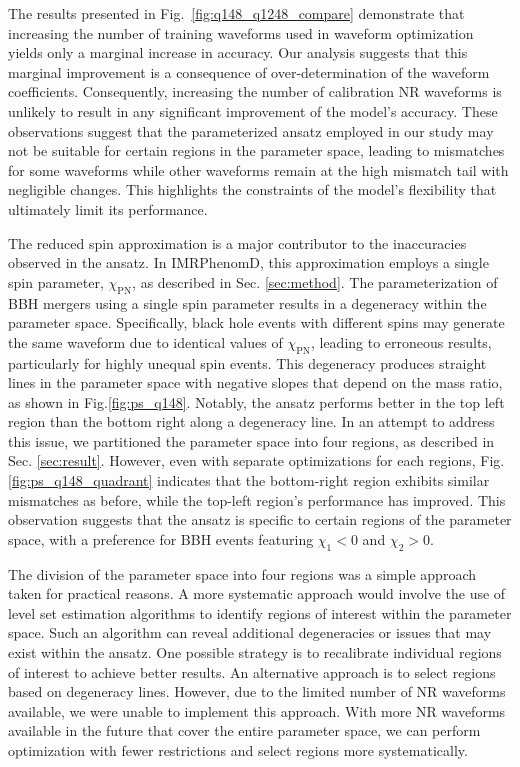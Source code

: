 \documentclass[twocolumn]{aastex631}
\begin{document}
The results presented in Fig.~\ref{fig:q148_q1248_compare} demonstrate that
increasing the number of training waveforms used in waveform optimization yields
only a marginal increase in accuracy. Our analysis suggests that this marginal
improvement is a consequence of over-determination of the waveform coefficients.
Consequently, increasing the number of calibration NR waveforms is unlikely to
result in any significant improvement of the model's accuracy. These
observations suggest that the parameterized ansatz employed in our study may not
be suitable for certain regions in the parameter space, leading to mismatches
for some waveforms while other waveforms remain at the high mismatch tail with
negligible changes. This highlights the constraints of the model's flexibility
that ultimately limit its performance.

The reduced spin approximation is a major contributor to the inaccuracies
observed in the ansatz. In IMRPhenomD, this approximation employs a single spin
parameter, $\chi_{\mathrm{PN}}$, as described in Sec. \ref{sec:method}. The
parameterization of BBH mergers using a single spin parameter results in a
degeneracy within the parameter space. Specifically, black hole events with
different spins may generate the same waveform due to identical values of
$\chi_{\mathrm{PN}}$, leading to erroneous results, particularly for highly
unequal spin events. This degeneracy produces straight lines in the parameter
space with negative slopes that depend on the mass ratio, as shown in
Fig.\ref{fig:ps_q148}. Notably, the ansatz performs better in the top left
region than the bottom right along a degeneracy line. In an attempt to address
this issue, we partitioned the parameter space into four regions, as described
in Sec. \ref{sec:result}. However, even with separate optimizations for each
regions, Fig.\ref{fig:ps_q148_quadrant} indicates that the bottom-right region
exhibits similar mismatches as before, while the top-left region's performance
has improved. This observation suggests that the ansatz is specific to certain
regions of the parameter space, with a preference for BBH events featuring
$\chi_1<0$ and $\chi_2>0$.

The division of the parameter space into four regions was a simple approach
taken for practical reasons. A more systematic approach would involve the use of
level set estimation algorithms to identify regions of interest within the
parameter space. Such an algorithm can reveal additional degeneracies or issues
that may exist within the ansatz. One possible strategy is to recalibrate
individual regions of interest to achieve better results. An alternative
approach is to select regions based on degeneracy lines. However, due to the
limited number of NR waveforms available, we were unable to implement this
approach. With more NR waveforms available in the future that cover the entire
parameter space, we can perform optimization with fewer restrictions and select
regions more systematically.
\end{document}
